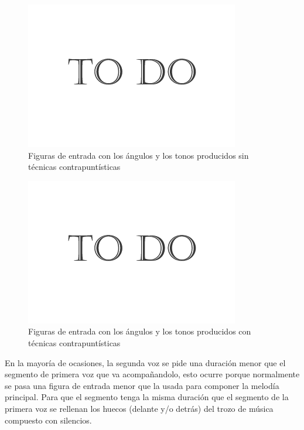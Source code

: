 		\begin{figure}[htbp]
		\centering
		\hspace*{0.0in}
		\includegraphics[scale=0.57]{graphics/todo.png}
		\caption{Figuras de entrada con los ángulos y los tonos producidos sin técnicas contrapuntísticas}
		\label{fig:Figura2Voz2}
		\end{figure}

		\begin{figure}[htbp]
		\centering
		\hspace*{0.0in}
		\includegraphics[scale=0.57]{graphics/todo.png}
		\caption{Figuras de entrada con los ángulos y los tonos producidos con técnicas contrapuntísticas}
		\label{fig:Figura3Voz2}
		\end{figure}

En la mayoría de ocasiones, la segunda voz se pide una duración menor que el segmento de primera voz que va acompañandolo, esto ocurre porque normalmente se pasa una figura de entrada menor que la usada para componer la melodía principal. Para que el segmento tenga la misma duración que el segmento de la primera voz se rellenan los huecos (delante y/o detrás) del trozo de música compuesto con silencios.


